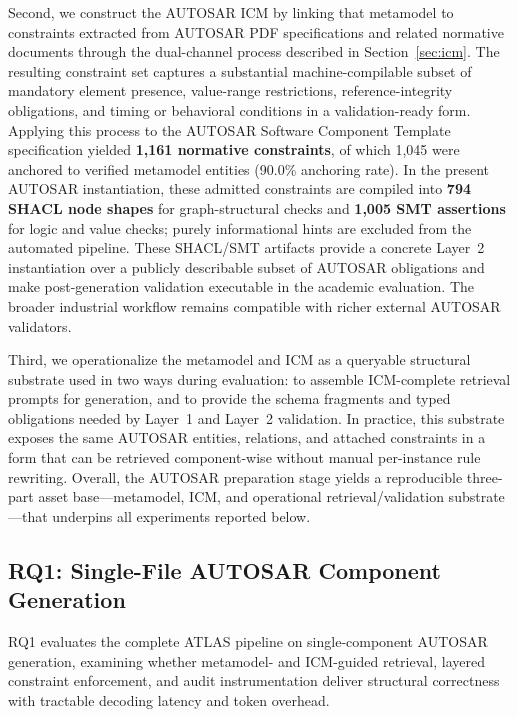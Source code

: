 \documentclass[acmlarge,nonacm]{acmart}
\theoremstyle{acmplain}
\theoremstyle{acmdefinition}
\begin{document}
Second, we construct the AUTOSAR ICM by linking that metamodel to constraints extracted from AUTOSAR PDF specifications and related normative documents through the dual-channel process described in Section~\ref{sec:icm}. The resulting constraint set captures a substantial machine-compilable subset of mandatory element presence, value-range restrictions, reference-integrity obligations, and timing or behavioral conditions in a validation-ready form. Applying this process to the AUTOSAR Software Component Template specification yielded \textbf{1,161 normative constraints}, of which 1,045 were anchored to verified metamodel entities (90.0\% anchoring rate). In the present AUTOSAR instantiation, these admitted constraints are compiled into \textbf{794 SHACL node shapes} for graph-structural checks and \textbf{1,005 SMT assertions} for logic and value checks; purely informational hints are excluded from the automated pipeline. These SHACL/SMT artifacts provide a concrete Layer~2 instantiation over a publicly describable subset of AUTOSAR obligations and make post-generation validation executable in the academic evaluation. The broader industrial workflow remains compatible with richer external AUTOSAR validators.

Third, we operationalize the metamodel and ICM as a queryable structural substrate used in two ways during evaluation: to assemble ICM-complete retrieval prompts for generation, and to provide the schema fragments and typed obligations needed by Layer~1 and Layer~2 validation. In practice, this substrate exposes the same AUTOSAR entities, relations, and attached constraints in a form that can be retrieved component-wise without manual per-instance rule rewriting. Overall, the AUTOSAR preparation stage yields a reproducible three-part asset base---metamodel, ICM, and operational retrieval/validation substrate---that underpins all experiments reported below.

\subsection{RQ1: Single-File AUTOSAR Component Generation}
\label{sec:rq1-autosar}
RQ1 evaluates the complete ATLAS pipeline on single-component AUTOSAR generation, examining whether metamodel- and ICM-guided retrieval, layered constraint enforcement, and audit instrumentation deliver structural correctness with tractable decoding latency and token overhead.
\end{document}
